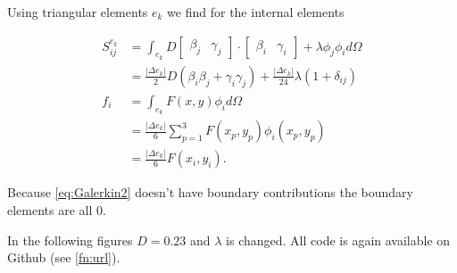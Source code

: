 \documentclass[10pt,a4paper]{article}
\begin{document}
Using triangular elements $e_k$ we find for the internal elements 

\begin{equation}
\begin{split}
S_{ij}^{e_k} &= \int_{e_k} D 
\begin{bmatrix}
\beta_j & \gamma_j
\end{bmatrix} \cdot 
\begin{bmatrix}
\beta_i & \gamma_i
\end{bmatrix} + \lambda \phi_j \phi_i d\Omega \\
&= \frac{|\Delta e_k|}{2} D \left( \beta_i \beta_j + \gamma_i \gamma_j \right) + \frac{|\Delta e_k |}{24} \lambda \left( 1 + \delta_{ij} \right) \\
f_i &= \int_{e_k} F(x,y) \phi_i d\Omega \\
&= \frac{|\Delta e_k|}{6} \sum_{p=1}^3 F(x_p,y_p) \phi_i(x_p,y_p) \\
&= \frac{|\Delta e_k|}{6} F(x_i,y_i).
\end{split}
\end{equation}

Because \cref{eq:Galerkin2} doesn't have boundary contributions the boundary elements are all $0$.

In the following figures $D=0.23$ and $\lambda$ is changed. All code is again available on Github (see \cref{fn:url}).
\end{document}
